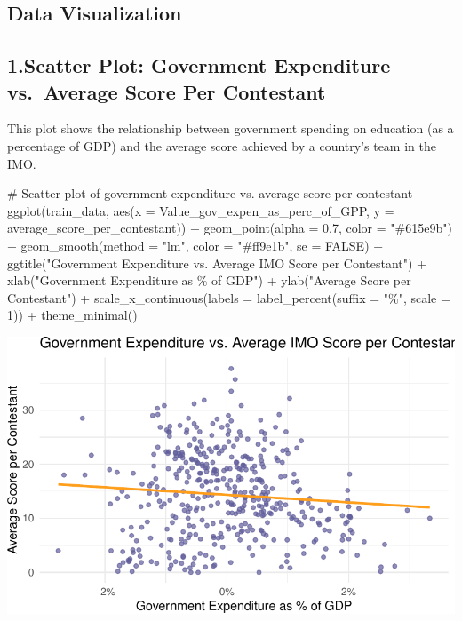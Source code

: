 \documentclass[
  letterpaper,
  DIV=11,
  numbers=noendperiod]{scrartcl}
\newenvironment{Shaded}{\begin{snugshade}}{\end{snugshade}}
\newcommand{\AttributeTok}[1]{\textcolor[rgb]{0.40,0.45,0.13}{#1}}
\newcommand{\CommentTok}[1]{\textcolor[rgb]{0.37,0.37,0.37}{#1}}
\newcommand{\ConstantTok}[1]{\textcolor[rgb]{0.56,0.35,0.01}{#1}}
\newcommand{\DecValTok}[1]{\textcolor[rgb]{0.68,0.00,0.00}{#1}}
\newcommand{\FloatTok}[1]{\textcolor[rgb]{0.68,0.00,0.00}{#1}}
\newcommand{\FunctionTok}[1]{\textcolor[rgb]{0.28,0.35,0.67}{#1}}
\newcommand{\NormalTok}[1]{\textcolor[rgb]{0.00,0.23,0.31}{#1}}
\newcommand{\SpecialCharTok}[1]{\textcolor[rgb]{0.37,0.37,0.37}{#1}}
\newcommand{\StringTok}[1]{\textcolor[rgb]{0.13,0.47,0.30}{#1}}
\begin{document}
\subsection{Data Visualization}\label{data-visualization}

\subsection{1.Scatter Plot: Government Expenditure vs.~Average Score Per
Contestant}\label{scatter-plot-government-expenditure-vs.-average-score-per-contestant}

This plot shows the relationship between government spending on
education (as a percentage of GDP) and the average score achieved by a
country's team in the IMO.

\begin{Shaded}
\begin{Highlighting}[]
\CommentTok{\# Scatter plot of government expenditure vs. average score per contestant}
\FunctionTok{ggplot}\NormalTok{(train\_data, }\FunctionTok{aes}\NormalTok{(}\AttributeTok{x =}\NormalTok{ Value\_gov\_expen\_as\_perc\_of\_GPP, }\AttributeTok{y =}\NormalTok{ average\_score\_per\_contestant)) }\SpecialCharTok{+}
  \FunctionTok{geom\_point}\NormalTok{(}\AttributeTok{alpha =} \FloatTok{0.7}\NormalTok{, }\AttributeTok{color =} \StringTok{"\#615e9b"}\NormalTok{) }\SpecialCharTok{+}
  \FunctionTok{geom\_smooth}\NormalTok{(}\AttributeTok{method =} \StringTok{"lm"}\NormalTok{, }\AttributeTok{color =} \StringTok{"\#ff9e1b"}\NormalTok{, }\AttributeTok{se =} \ConstantTok{FALSE}\NormalTok{) }\SpecialCharTok{+}
  \FunctionTok{ggtitle}\NormalTok{(}\StringTok{"Government Expenditure vs. Average IMO Score per Contestant"}\NormalTok{) }\SpecialCharTok{+}
  \FunctionTok{xlab}\NormalTok{(}\StringTok{"Government Expenditure as \% of GDP"}\NormalTok{) }\SpecialCharTok{+}
  \FunctionTok{ylab}\NormalTok{(}\StringTok{"Average Score per Contestant"}\NormalTok{) }\SpecialCharTok{+}
  \FunctionTok{scale\_x\_continuous}\NormalTok{(}\AttributeTok{labels =} \FunctionTok{label\_percent}\NormalTok{(}\AttributeTok{suffix =} \StringTok{"\%"}\NormalTok{, }\AttributeTok{scale =} \DecValTok{1}\NormalTok{)) }\SpecialCharTok{+}
  \FunctionTok{theme\_minimal}\NormalTok{()}
\end{Highlighting}
\end{Shaded}

\includegraphics{proj_EDA_f24_sbekova_files/figure-pdf/unnamed-chunk-4-1.pdf}
\end{document}
